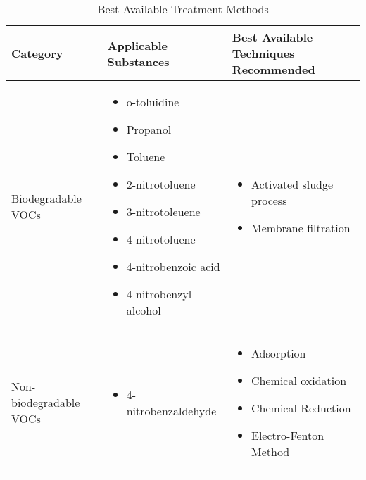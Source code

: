 \begin{table}[H]
\centering
\caption{Best Available Treatment Methods}
\label{tab:treat}
\begin{tabularx}{\linewidth}{lp{45mm}X}
\toprule
\textbf{Category}      & \textbf{Applicable Substances}                                                                                                                           												 	& \textbf{Best Available Techniques Recommended \cite{european_commission_joint_research_centre_best_2018} }         				\\ \midrule
Biodegradable VOCs     & \begin{itemize} \item o-toluidine \item Propanol \item Toluene \item 2-nitrotoluene  \item  3-nitrotoleuene \item  4-nitrotoluene  \item  4-nitrobenzoic acid \item 4-nitrobenzyl alcohol \end{itemize} 	& \begin{itemize} \item Activated sludge process \item Membrane filtration \end{itemize}                               			\\ \cmidrule{1-3}
Non-biodegradable VOCs & \begin{itemize} \item 4-nitrobenzaldehyde \end{itemize}                                                                                                                                                 	& \begin{itemize} \item Adsorption \item  Chemical oxidation  \item Chemical Reduction \item Electro-Fenton Method \end{itemize} 	\\ \bottomrule
\end{tabularx}
\end{table}


